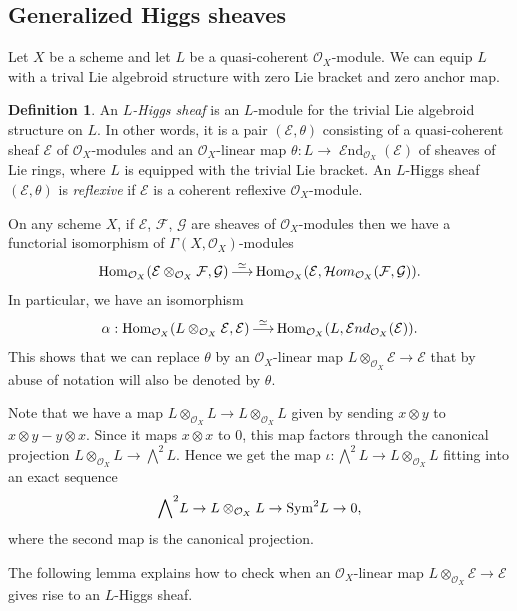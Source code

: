 \documentclass[12pt]{article}
\theoremstyle{plain}
\theoremstyle{definition}
\newtheorem{Definition}[Thm]{Definition}
\theoremstyle{remark}
\newcommand{\cE}{{\mathcal E}}
\newcommand{\cF}{{\mathcal F}}
\newcommand{\cG}{{\mathcal G}}
\newcommand{\cO}{{\mathcal O}}
\newcommand{\Hom}{{\mathop{{\rm Hom}}}}
\newcommand{\cHom}{{\mathop{{\cal H}om}}}
\newcommand{\End}{{\mathop{{\mathcal E}nd}}}
\newcommand{\Sym}{{\mathop{{\rm Sym}}}}
\begin{document}
\subsection{Generalized Higgs sheaves}

Let $X$ be a scheme and let $L$ be a quasi-coherent $\cO_X$-module. We can equip $L$ with a trival Lie algebroid structure with zero Lie bracket and zero anchor map.

\begin{Definition}
	An \emph{$L$-Higgs sheaf} is an $L$-module for the trivial Lie algebroid structure on $L$. In other words, it is a pair $(\cE, \theta)$ consisting of a quasi-coherent sheaf $\cE$ of $\cO_X$-modules and an $\cO_X$-linear  map $\theta : L\to \End _{\cO_X} (\cE) $ of sheaves of Lie rings, where $L$ is equipped with the trivial  Lie bracket. 
An $L$-Higgs sheaf $(\cE, \theta)$ is \emph{reflexive} if 
$\cE$ is a coherent reflexive $\cO_X$-module.
\end{Definition}

\medskip

On any scheme $X$, if $\cE$, $\cF$, $\cG$ are sheaves of $\cO_X$-modules then we have a functorial isomorphism of $\Gamma (X, \cO_X)$-modules
$$\Hom _{\cO_X} (\cE\otimes _{\cO_X} \cF, \cG)\mathop{\longrightarrow}^{\simeq}\Hom _{\cO_X}
(\cE, \cHom_{\cO_X}(\cF, \cG)).$$
In particular, we have an isomorphism
$$\alpha: \Hom _{\cO_X} (L\otimes _{\cO_X} \cE, \cE)\mathop{\longrightarrow}^{\simeq}\Hom _{\cO_X}
(L, \End _{\cO_X} (\cE)).$$
This shows that we can replace $\theta$ by an $\cO_X$-linear map $L\otimes _{\cO_X}\cE\to \cE$ that by abuse of notation will also be denoted by $\theta$. 


\medskip

Note that we have a map $ L\otimes _{\cO_X}L \to L\otimes _{\cO_X}L$ given by sending $x\otimes y$ to $x\otimes y-y\otimes x$. Since it maps $x\otimes x$ to $0$, this map factors through the canonical projection  $ L\otimes _{\cO_X}L\to {\bigwedge}^2L$. Hence we get the map $\iota: {\bigwedge}^2L\to  L\otimes _{\cO_X}L$ fitting into an exact sequence
$${\bigwedge}^2L\to  L\otimes _{\cO_X}L \to \Sym ^2 L\to 0,$$ 
where the second map is the canonical projection.

The following lemma explains how to check when an $\cO_X$-linear map $L\otimes _{\cO_X}\cE\to \cE$ gives rise to an $L$-Higgs sheaf.
\end{document}
